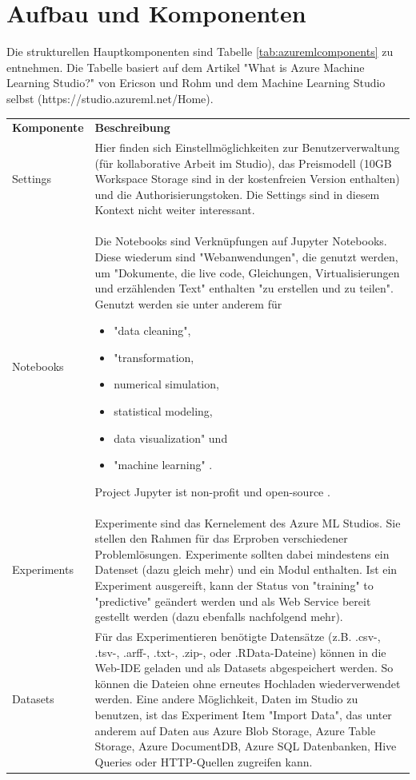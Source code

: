 \section{Aufbau und Komponenten}\label{sec:auK1}
Die strukturellen Hauptkomponenten sind Tabelle \ref{tab:azuremlcomponents} zu entnehmen. Die Tabelle basiert auf dem Artikel "What is Azure Machine Learning Studio?" von Ericson und Rohm und dem Machine Learning Studio selbst \citep{ericson_what_2017} (https://studio.azureml.net/Home).
\begin{longtable}[H]{|p{}|p{14cm}|}
\hline
\textbf{Komponente} & \textbf{Beschreibung}\\ 
\hhline{==}
Settings & Hier finden sich Einstellmöglichkeiten zur Benutzerverwaltung (für kollaborative Arbeit im Studio), das Preismodell (10GB Workspace Storage sind in der kostenfreien Version enthalten) und die Authorisierungstoken. Die Settings sind in diesem Kontext nicht weiter interessant. \\
\hline
Notebooks & Die Notebooks sind Verknüpfungen auf Jupyter Notebooks. Diese wiederum sind "Webanwendungen", die genutzt werden, um "Dokumente, die live code, Gleichungen, Virtualisierungen und erzählenden Text" enthalten "zu erstellen und zu teilen". Genutzt werden sie unter anderem für 
\begin{itemize}
\item "data cleaning",
\item "transformation,
\item numerical simulation,
\item statistical modeling,
\item data visualization" und
\item "machine learning" \citep{projectjupyter_jupyter_2017}.
\end{itemize}
Project Jupyter ist non-profit und open-source \citep{projectjupyter_about_2017}. \\
\hline
Experiments & Experimente sind das Kernelement des Azure ML Studios. Sie stellen den Rahmen für das Erproben verschiedener Problemlösungen. Experimente sollten dabei mindestens ein Datenset (dazu gleich mehr) und ein Modul enthalten. Ist ein Experiment ausgereift, kann der Status von "training" to "predictive" geändert werden und als Web Service bereit gestellt werden (dazu ebenfalls nachfolgend mehr).\\
\hline
Datasets & Für das Experimentieren benötigte Datensätze (z.B. .csv-, .tsv-, .arff-, .txt-, .zip-, oder .RData-Dateine) können in die Web-IDE geladen und als Datasets abgespeichert werden. So können die Dateien ohne erneutes Hochladen wiederverwendet werden. Eine andere Möglichkeit, Daten im Studio zu benutzen, ist das Experiment Item "Import Data", das unter anderem auf Daten aus Azure Blob Storage, Azure Table Storage, Azure DocumentDB, Azure SQL Datenbanken, Hive Queries oder HTTP-Quellen zugreifen kann.\\

\end{longtable}
